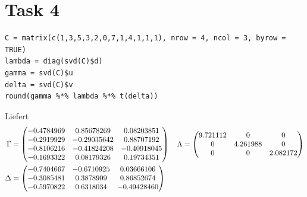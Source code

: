 \documentclass{article}
\begin{document}
	\section*{Task 4}
	\begin{lstlisting}
C = matrix(c(1,3,5,3,2,0,7,1,4,1,1,1), nrow = 4, ncol = 3, byrow = TRUE)
lambda = diag(svd(C)$d)
gamma = svd(C)$u
delta = svd(C)$v
round(gamma %*% lambda %*% t(delta))
	\end{lstlisting}
	Liefert
	\begin{align}
		\Gamma &= \begin{pmatrix}
			-0.4784969 & 0.85678269 & 0.08203851 \\
			-0.2919929 & -0.29035642 & 0.88707192 \\
			-0.8106216 & -0.41824208 & -0.40918045 \\
			-0.1693322 & 0.08179326 & 0.19734351
		\end{pmatrix} \quad \Lambda = \begin{pmatrix}
			9.721112 & 0 & 0 \\
			0 & 4.261988 & 0 \\
			0 & 0 & 2.082172
		\end{pmatrix} \notag \\
		 \Delta &= \begin{pmatrix}
			-0.7404667 & -0.6710925 & 0.03666106 \\
			-0.3085481 & 0.3878909 & 0.86852674 \\
			-0.5970822 & 0.6318034 & -0.49428460
		\end{pmatrix} \notag
	\end{align}
\end{document}
